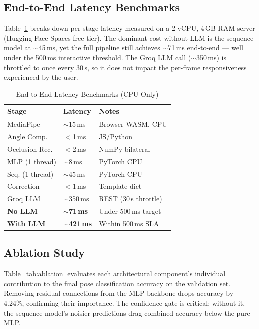 \documentclass[conference]{IEEEtran}
\begin{document}
\subsection{End-to-End Latency Benchmarks}

Table~\ref{tab:latency} breaks down per-stage latency measured on a 2-vCPU,
4\,GB RAM server (Hugging Face Spaces free tier). The dominant cost without LLM
is the sequence model at $\sim$45\,ms, yet the full pipeline still achieves
$\sim$71\,ms end-to-end --- well under the 500\,ms interactive threshold.
The Groq LLM call ($\sim$350\,ms) is throttled to once every 30\,s, so it
does not impact the per-frame responsiveness experienced by the user.

\begin{table}[!t]
\centering
\caption{End-to-End Latency Benchmarks (CPU-Only)}
\label{tab:latency}
\small
\begin{tabular}{@{}p{2.0cm}p{1.1cm}p{4.2cm}@{}}
\toprule
\textbf{Stage} & \textbf{Latency} & \textbf{Notes} \\
\midrule
MediaPipe & $\sim$15\,ms & Browser WASM, CPU \tabularnewline
Angle Comp. & $<$1\,ms & JS/Python \tabularnewline
Occlusion Rec. & $<$2\,ms & NumPy bilateral \tabularnewline
MLP (1 thread) & $\sim$8\,ms & PyTorch CPU \tabularnewline
Seq. (1 thread) & $\sim$45\,ms & PyTorch CPU \tabularnewline
Correction & $<$1\,ms & Template dict \tabularnewline
Groq LLM & $\sim$350\,ms & REST (30\,s throttle) \tabularnewline
\midrule
\textbf{No LLM} & \textbf{$\sim$71\,ms} & Under 500\,ms target \tabularnewline
\textbf{With LLM} & \textbf{$\sim$421\,ms} & Within 500\,ms SLA \tabularnewline
\bottomrule
\end{tabular}
\end{table}

\subsection{Ablation Study}

Table~\ref{tab:ablation} evaluates each architectural component's individual
contribution to the final pose classification accuracy on the validation set.
Removing residual connections from the MLP backbone drops accuracy by 4.24\%,
confirming their importance. The confidence gate is critical: without it, the
sequence model's noisier predictions drag combined accuracy below the pure MLP.
\end{document}
